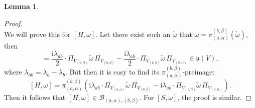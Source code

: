 \documentclass[10pt,a4paper]{amsart}
\theoremstyle{definition}
\newtheorem{lemma}[remark]{Lemma}
\begin{document}
\begin{lemma}
\begin{proof}
\begin{equation}
        \end{equation}
    We will prove this for $[H,\omega]$. Let there exist such an $\tilde{\omega}$ that $\omega=\pi_{(a,\alpha)}^{(b,\beta)}(\tilde{\omega})$, then
        \begin{equation}
            [H,\omega]=\frac{\mathrm{i}\lambda_{ab}}{2}\cdot \Pi_{V_{(a,\alpha)}}\tilde{\omega}\,\Pi_{V_{(b,\beta)}}-\frac{\mathrm{i}\lambda_{ab}}{2}\cdot \Pi_{V_{(b,\beta)}}\tilde{\omega}\,\Pi_{V_{(a,\alpha)}}\in \mathfrak{u}(V),
        \end{equation}
    where $\lambda_{ab}=\lambda_{a}-\lambda_{b}$. But then it is easy to find its $\pi_{(a,\alpha)}^{(b,\beta)}$-preimage:
        \begin{equation}
        \label{preimage}
            [H,\omega]=\pi_{(a,\alpha)}^{(b,\beta)}(\mathrm{i}\lambda_{ab}\cdot \Pi_{V_{(a,\alpha)}}\tilde{\omega}\,\Pi_{V_{(b,\beta)}}-\mathrm{i}\lambda_{ab}\cdot\Pi_{V_{(b,\beta)}}\tilde{\omega}\,\Pi_{V_{(a,\alpha)}}).
        \end{equation}
        Then it follows that $[H,\omega]\in\mathcal{B}_{(a,\alpha),(b,\beta)}$. For $[S,\omega]$, the proof is similar.
    \end{proof}
\end{lemma}
\end{document}
